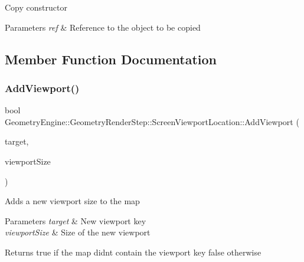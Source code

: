 Copy constructor 
\begin{DoxyParams}{Parameters}
{\em ref} & Reference to the object to be copied \\
\hline
\end{DoxyParams}


\subsection{Member Function Documentation}
\mbox{\label{class_geometry_engine_1_1_geometry_render_step_1_1_screen_viewport_location_aafca840a5b85f1c8b3fd13603f610682}} 
\subsubsection{\texorpdfstring{AddViewport()}{AddViewport()}}
{\footnotesize\ttfamily bool Geometry\+Engine\+::\+Geometry\+Render\+Step\+::\+Screen\+Viewport\+Location\+::\+Add\+Viewport (\begin{DoxyParamCaption}\item[{\mbox{\hyperlink{namespace_geometry_engine_1_1_geometry_world_item_1_1_geometry_camera_a3766848bae97ff8203fa26907ac359ef}{Geometry\+World\+Item\+::\+Geometry\+Camera\+::\+Camera\+Targets}}}]{target,  }\item[{Q\+Vector4D}]{viewport\+Size }\end{DoxyParamCaption})}

Adds a new viewport size to the map 
\begin{DoxyParams}{Parameters}
{\em target} & New viewport key \\
\hline
{\em viewport\+Size} & Size of the new viewport \\
\hline
\end{DoxyParams}
\begin{DoxyReturn}{Returns}
true if the map didn\textquotesingle{}t contain the viewport key false otherwise 
\end{DoxyReturn}
\mbox{\label{class_geometry_engine_1_1_geometry_render_step_1_1_screen_viewport_location_aca54be537a99da891061c74cb1573f07}} 
